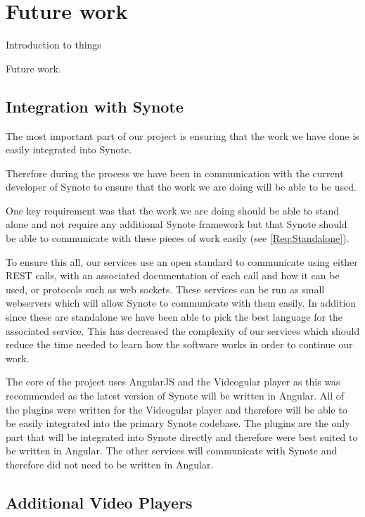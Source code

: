 \chapter{Future work} \label{Chapter: Future Work}

Introduction to things

Future work.

\section{Integration with Synote}

The most important part of our project is ensuring that the work we have done is easily integrated into Synote.

Therefore during the process we have been in communication with the current developer of Synote to ensure that the work we are doing will be able to be used.

One key requirement was that the work we are doing should be able to stand alone and not require any additional Synote framework but that Synote should be able to communicate with these pieces of work easily (see \cref{Req:Standalone}).

To ensure this all, our services use an open standard to communicate using either \gls{REST} calls, with an associated documentation of each call and how it can be used, or protocols such as web sockets. These services can be run as small webservers which will allow Synote to communicate with them easily. In addition since these are standalone we have been able to pick the best language for the associated service. This has decreased the complexity of our services which should reduce the time needed to learn how the software works in order to continue our work.

The core of the project uses \gls{AngularJS} and the \gls{Videogular} player as this was recommended as the latest version of Synote will be written in Angular. All of the plugins were written for the \gls{Videogular} player and therefore will be able to be easily integrated into the primary Synote codebase. The plugins are the only part that will be integrated into Synote directly and therefore were best suited to be written in Angular. The other services will communicate with Synote and therefore did not need to be written in Angular.

\section{Additional Video Players}

